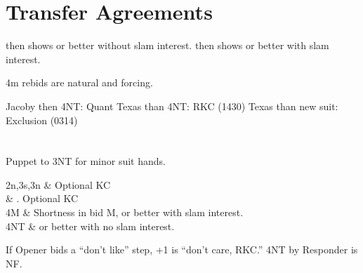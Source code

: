 \documentclass[main]{subfile}
\begin{document}
\section{Transfer Agreements}

 then  shows  or better without slam interest.
 then  shows  or better with slam interest.

4m rebids are natural and forcing.

Jacoby then 4NT:  Quant
Texas than 4NT:  RKC (1430)
Texas than new suit: Exclusion (0314)

\section[3S]{}

Puppet to 3NT for minor suit hands.

\begin{bidtable}{2n,3s,3n}
	 & \ddd Optional KC \\
	 & \ccc. Optional KC \\
	4M & Shortness in bid M,  or better with slam interest. \\
	4NT &  or better with no slam interest. \\
\end{bidtable}

If Opener bids a ``don't like'' step, +1 is ``don't care, RKC.'' 4NT by Responder is NF.
\end{document}
